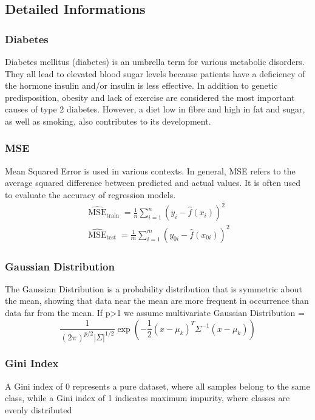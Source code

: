 \documentclass[12pt,a4paper,titlepage]{article}
\numberwithin{equation}{section}
\numberwithin{table}{section}
\numberwithin{figure}{section}
\begin{document}
    \subsection{Detailed Informations}
        \subsubsection{Diabetes}\label{app:diabetes}
        Diabetes mellitus (diabetes) is an umbrella term for various metabolic disorders. They all lead to elevated blood sugar levels because patients have a deficiency of the hormone insulin and/or insulin is less effective. In addition to genetic predisposition, obesity and lack of exercise are considered the most important causes of type 2 diabetes. However, a diet low in fibre and high in fat and sugar, as well as smoking, also contributes to its development.
        \subsubsection{MSE}\label{app:MSE}
        Mean Squared Error is used in various contexts. In general, MSE refers to the average squared difference between predicted and actual values. It is often used to evaluate the accuracy of regression models.
        \begin{align*}
        \widehat{\operatorname{MSE}}_{\text{train}}=\frac{1}{n}\sum_{i=1}^n\left(y_i - \hat{f}(x_i)\right)^2 \\
        \widehat{\operatorname{MSE}}_{\text{test}}= \frac{1}{m}\sum_{i=1}^m\left(y_{0i} - \hat{f}(x_{0i})\right)^2
        \end{align*}
        \subsubsection{Gaussian Distribution}\label{app:gaussian}
        The Gaussian Distribution is a probability distribution that is symmetric about the mean, showing that data near the mean are more frequent in occurrence than data far from the mean. If p>1 we assume multivariate Gaussian Distribution = $$\frac{1}{(2\pi)^{p/2}|\Sigma|^{1/2}}\exp\left(-\frac{1}{2}(x-\mu_k)^T\Sigma^{-1}(x-\mu_k)\right)$$
        \subsubsection{Gini Index}\label{app:gini}
        A Gini index of 0 represents a pure dataset, where all samples belong to the same class, while a Gini index of 1 indicates maximum impurity, where classes are evenly distributed
\end{document}
